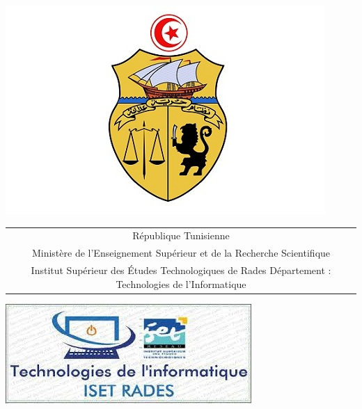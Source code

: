 \documentclass[a4paper, oneside, 12pt, final]{extreport}
\title{\reportSubject}
\author{\reportAuthor}
\newcommand{\reportTitle} {%
  \textsc{ Projet de Fin d'Etudes}
}
\newcommand{\ESSAI} {%
  Institut Supérieur des
  Études Technologiques de Rades
  Département : Technologies de l’Informatique
  
}
\begin{document}
\begin{titlepage}
\begin{center}



\includegraphics[scale=0.25]{embleme.jpg}


{%
  \fontsize{9pt}{9pt}\selectfont%
  \begin{tabular}{c}
    R\'epublique Tunisienne \\
    Minist\`ere de l'Enseignement Supérieur et de la Recherche Scientifique \\%
    \ESSAI{}\\ 
  \end{tabular}
}
\vspace{10pt}



\includegraphics[scale=0.54]{iset.jpg}
\vspace{5pt}


 {%
  \renewcommand*{\familydefault}{\defaultFont}
  \fontsize{46pt}{46pt}\selectfont%
}


\end{center}
\end{titlepage}
\end{document}
